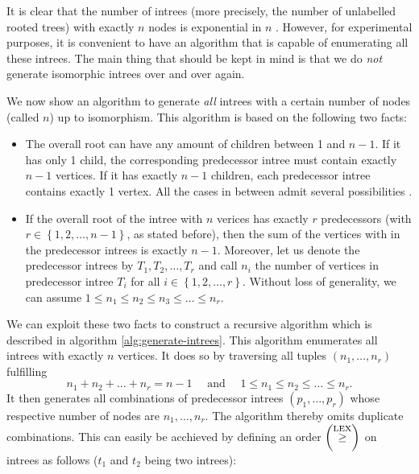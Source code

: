 It is clear that the number of intrees (more precisely, the number of unlabelled rooted trees) with exactly $n$ nodes is exponential in $n$ . However, for experimental purposes, it is convenient to have an algorithm that is capable of enumerating all these intrees. The main thing that should be kept in mind is that we do \emph{not} generate isomorphic intrees over and over again.

We now show an algorithm to generate \emph{all} intrees with a certain number of nodes (called $n$) up to isomorphism. This algorithm is based on the following two facts: 

\begin{itemize}
  \item The overall root can have any amount of children between 1 and $n-1$. If it has only 1 child, the corresponding predecessor intree must contain exactly $n-1$ vertices. If it has exactly $n-1$ children, each predecessor intree contains exactly 1 vertex. All the cases in between admit several possibilities .
  \item If the overall root of the intree with $n$ verices has exactly $r$ predecessors (with $r \in \left\{ 1,2,\dots,n-1 \right\}$, as stated before), then the sum of the vertices with in the predecessor intrees is exactly $n-1$. Moreover, let us denote the predecessor intrees by $T_1,T_2,\dots,T_r$ and call $n_i$ the number of vertices in predecessor intree $T_i$ for all $i\in\left\{1,2,\dots,r \right\}$. Without loss of generality, we can assume $1 \leq n_1 \leq n_2 \leq n_3 \leq \dots \leq n_r$.
\end{itemize}

We can exploit these two facts to construct a recursive algorithm which is described in algorithm \ref{alg:generate-intrees}. This algorithm enumerates all intrees with exactly $n$ vertices. It does so by traversing all tuples $(n_1,\dots,n_r)$ fulfilling
\begin{equation*}
  n_1 + n_2 + \dots + n_r = n-1 \quad \text{ and } \quad 1\leq n_1\leq n_2\leq\dots\leq n_r.
\end{equation*}
It then generates all combinations of predecessor intrees $(p_1,\dots,p_r)$ whose respective number of nodes are $n_1,\dots,n_r$. The algorithm thereby omits duplicate combinations. This can easily be acchieved by defining an order $\left(\stackrel{\text{LEX}}{\geq}\right)$ on intrees as follows ($t_1$ and $t_2$ being two intrees):


